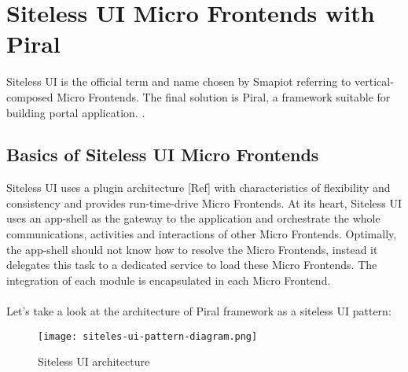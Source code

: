 \documentclass[a4paper]{book}
\begin{document}
\chapter{Siteless UI Micro Frontends with Piral}
Siteless UI is the official term and name chosen by Smapiot \cite{Piral} referring to vertical-composed Micro Frontends. The final solution is Piral, a framework suitable for building portal application. \cite{Piral}.
\section{Basics of Siteless UI Micro Frontends }
Siteless UI uses a plugin architecture [Ref] with characteristics of flexibility and consistency and provides run-time-drive Micro Frontends. At its heart, Siteless UI uses an app-shell as the gateway to the application and orchestrate the whole communications, activities and interactions of other Micro Frontends. Optimally, the app-shell should not know how to resolve the Micro Frontends, instead it delegates this task to a dedicated service to load these Micro Frontends. The integration of each module is encapsulated in each Micro Frontend. 
\\ \\ 
Let’s take a look at the architecture of Piral framework as a siteless UI pattern:
\begin{figure}[h!]
    \centering
    \captionsetup{justification=centering}
    \texttt{[image: siteles-ui-pattern-diagram.png]}
    \caption{Siteless UI architecture \cite{Rap20}}
    \label{fig:6}
\end{figure}
\end{document}
